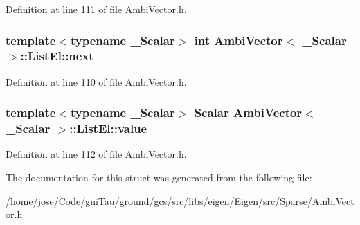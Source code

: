 Definition at line 111 of file Ambi\-Vector.\-h.

\hypertarget{struct_ambi_vector_1_1_list_el_ad3f6f5a564dcfef92737262ba9076fc1}{
\subsubsection[{next}]{\setlength{\rightskip}{0pt plus 5cm}template$<$typename \-\_\-\-Scalar$>$ {\bf int} {\bf Ambi\-Vector}$<$ \-\_\-\-Scalar $>$\-::List\-El\-::next}}\label{struct_ambi_vector_1_1_list_el_ad3f6f5a564dcfef92737262ba9076fc1}


Definition at line 110 of file Ambi\-Vector.\-h.

\hypertarget{struct_ambi_vector_1_1_list_el_a17bb0185658f78a923e35c4f5e6a553c}{
\subsubsection[{value}]{\setlength{\rightskip}{0pt plus 5cm}template$<$typename \-\_\-\-Scalar$>$ {\bf Scalar} {\bf Ambi\-Vector}$<$ \-\_\-\-Scalar $>$\-::List\-El\-::value}}\label{struct_ambi_vector_1_1_list_el_a17bb0185658f78a923e35c4f5e6a553c}


Definition at line 112 of file Ambi\-Vector.\-h.



The documentation for this struct was generated from the following file\-:\begin{DoxyCompactItemize}
\item 
/home/jose/\-Code/gui\-Tau/ground/gcs/src/libs/eigen/\-Eigen/src/\-Sparse/\hyperlink{_ambi_vector_8h}{Ambi\-Vector.\-h}\end{DoxyCompactItemize}
